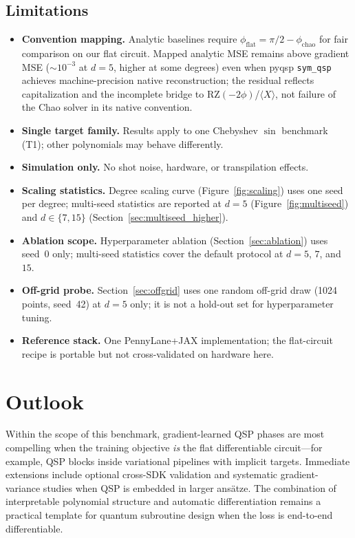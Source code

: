 \documentclass[11pt,a4paper]{article}
\begin{document}
\subsection{Limitations}
\label{sec:limitations}

\begin{itemize}\setlength\itemsep{2pt}
  \item \textbf{Convention mapping.} Analytic baselines require $\phi_{\mathrm{flat}}=\pi/2-\phi_{\mathrm{chao}}$ for fair comparison on our flat circuit. Mapped analytic MSE remains above gradient MSE ($\sim10^{-3}$ at $d=5$, higher at some degrees) even when pyqsp \texttt{sym\_qsp} achieves machine-precision native reconstruction; the residual reflects capitalization and the incomplete bridge to $\mathrm{RZ}(-2\phi)$/$\langle X\rangle$, not failure of the Chao solver in its native convention.
  \item \textbf{Single target family.} Results apply to one Chebyshev $\sin$ benchmark (T1); other polynomials may behave differently.
  \item \textbf{Simulation only.} No shot noise, hardware, or transpilation effects.
  \item \textbf{Scaling statistics.} Degree scaling curve (Figure~\ref{fig:scaling}) uses one seed per degree; multi-seed statistics are reported at $d=5$ (Figure~\ref{fig:multiseed}) and $d\in\{7,15\}$ (Section~\ref{sec:multiseed_higher}).
  \item \textbf{Ablation scope.} Hyperparameter ablation (Section~\ref{sec:ablation}) uses seed~0 only; multi-seed statistics cover the default protocol at $d=5$, $7$, and $15$.
  \item \textbf{Off-grid probe.} Section~\ref{sec:offgrid} uses one random off-grid draw (1024 points, seed~42) at $d=5$ only; it is not a hold-out set for hyperparameter tuning.
  \item \textbf{Reference stack.} One PennyLane+JAX implementation; the flat-circuit recipe is portable but not cross-validated on hardware here.
\end{itemize}

\section{Outlook}

Within the scope of this benchmark, gradient-learned QSP phases are most compelling when the training objective \emph{is} the flat differentiable circuit---for example, QSP blocks inside variational pipelines with implicit targets. Immediate extensions include optional cross-SDK validation and systematic gradient-variance studies when QSP is embedded in larger ans\"atze. The combination of interpretable polynomial structure and automatic differentiation remains a practical template for quantum subroutine design when the loss is end-to-end differentiable.

\nocite{*}
\printbibliography
\end{document}
